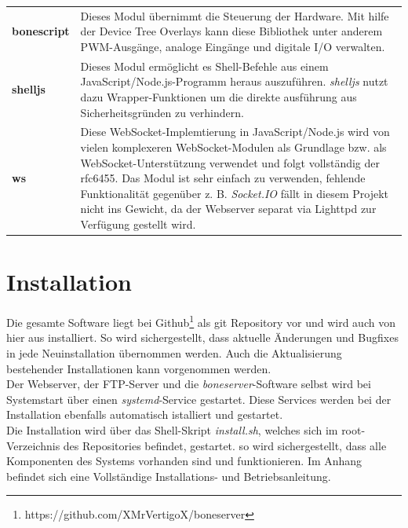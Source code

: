 \begin{longtabu} to \textwidth {
  X[1]
  X[5]}
  \textbf{bonescript} & Dieses Modul übernimmt die Steuerung der Hardware. Mit hilfe der Device Tree Overlays kann diese Bibliothek unter anderem PWM-Ausgänge, analoge Eingänge und digitale I/O verwalten.\\
  \textbf{shelljs} & Dieses Modul ermöglicht es Shell-Befehle aus einem JavaScript/Node.js-Programm heraus auszuführen. \textit{shelljs} nutzt dazu Wrapper-Funktionen um die direkte ausführung aus Sicherheitsgründen zu verhindern.\\
  \textbf{ws} & Diese WebSocket-Implemtierung in JavaScript/Node.js wird von vielen komplexeren WebSocket-Modulen als Grundlage bzw. als WebSocket-Unterstützung verwendet und folgt vollständig der rfc6455. Das Modul ist sehr einfach zu verwenden, fehlende Funktionalität gegenüber z. B. \emph{Socket.IO} fällt in diesem Projekt nicht ins Gewicht, da der Webserver separat via Lighttpd zur Verfügung gestellt wird.
\end{longtabu}


\section{Installation}
Die gesamte Software liegt bei Github\footnote{https://github.com/XMrVertigoX/boneserver} als git Repository vor und wird auch von hier aus installiert. So wird sichergestellt, dass aktuelle Änderungen und Bugfixes in jede Neuinstallation übernommen werden. Auch die Aktualisierung bestehender Installationen kann vorgenommen werden.\\
Der Webserver, der FTP-Server und die \textit{boneserver}-Software selbst wird bei Systemstart über einen \textit{systemd}-Service gestartet. Diese Services werden bei der Installation ebenfalls automatisch istalliert und gestartet.\\

Die Installation wird über das Shell-Skript \textit{install.sh}, welches sich im root-Verzeichnis des Repositories befindet, gestartet. so wird sichergestellt, dass alle Komponenten des Systems vorhanden sind und funktionieren. Im Anhang befindet sich eine Vollständige Installations- und Betriebsanleitung.